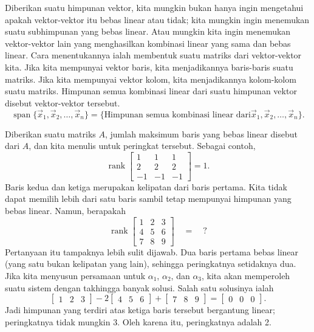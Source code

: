 Diberikan suatu himpunan vektor, kita mungkin bukan hanya ingin mengetahui apakah
vektor-vektor itu bebas linear atau tidak; kita mungkin ingin menemukan suatu subhimpunan yang bebas
linear. Atau mungkin kita ingin menemukan vektor-vektor lain yang
menghasilkan kombinasi linear yang sama dan bebas linear.
Cara menentukannya ialah membentuk suatu matriks dari vektor-vektor kita. Jika kita
mempunyai vektor baris, kita menjadikannya baris-baris suatu matriks. Jika kita mempunyai
vektor kolom, kita menjadikannya kolom-kolom suatu matriks.
Himpunan semua kombinasi linear dari suatu himpunan vektor disebut
\emph{} vektor-vektor tersebut.
\begin{equation*}
\operatorname{span} \bigl\{ \vec{x}_1, \vec{x}_2 , \ldots , \vec{x}_n \bigr\}
=
\bigl\{
\text{Himpunan semua kombinasi linear dari
$\vec{x}_1, \vec{x}_2 , \ldots , \vec{x}_n$}
\bigr\} .
\end{equation*}


Diberikan suatu matriks $A$, jumlah maksimum baris yang bebas linear disebut
\emph{} dari $A$, dan kita menulis
 untuk peringkat tersebut.
Sebagai contoh,
\begin{equation*}
\operatorname{rank}
\begin{bmatrix}
1 & 1 & 1 \\
2 & 2 & 2 \\
-1 & -1 & -1
\end{bmatrix}
=
1 .
\end{equation*}
Baris kedua dan ketiga
merupakan kelipatan dari baris pertama. Kita tidak dapat memilih lebih dari satu baris sambil
tetap mempunyai himpunan yang bebas linear. Namun, berapakah
\begin{equation*}
\operatorname{rank}
\begin{bmatrix}
1 & 2 & 3 \\
4 & 5 & 6 \\
7 & 8 & 9
\end{bmatrix} \quad = \quad ?
\end{equation*}
Pertanyaan itu tampaknya lebih sulit dijawab. Dua baris
pertama bebas linear (yang satu bukan kelipatan yang lain),
sehingga peringkatnya setidaknya
dua. Jika kita menyusun persamaan untuk $\alpha_1$, $\alpha_2$, dan
$\alpha_3$, kita akan memperoleh suatu sistem dengan takhingga banyak solusi. Salah satu
solusinya ialah
\begin{equation*}
\begin{bmatrix}
1 & 2 & 3
\end{bmatrix} -2
\begin{bmatrix}
4 & 5 & 6
\end{bmatrix} +
\begin{bmatrix}
7 & 8 & 9
\end{bmatrix} =
\begin{bmatrix}
0 & 0 & 0
\end{bmatrix} .
\end{equation*}
Jadi himpunan yang terdiri atas ketiga baris tersebut bergantung linear; peringkatnya tidak mungkin
3. Oleh karena itu, peringkatnya adalah 2.

